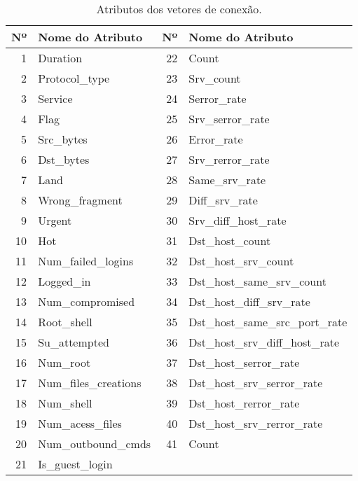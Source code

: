 \begin{table}[h]
\centering
\caption{Atributos dos vetores de conexão.}
\vspace{0.5cm}
\begin{tabular}{|r|l|r|l|}
\hline
\textbf{Nº} & \textbf{Nome do Atributo} & \textbf{Nº} & \textbf{Nome do Atributo} \\
\hline                               
1 & Duration 	  & 22 & Count \\
\hline
2 & Protocol\_type & 23 & Srv\_count \\
\hline
3 & Service    	  & 24 & Serror\_rate \\
\hline
4 & Flag          & 25 & Srv\_serror\_rate \\
\hline
5 & Src\_bytes    & 26 & Error\_rate \\
\hline
6 & Dst\_bytes	  & 27 & Srv\_rerror\_rate \\
\hline
7 & Land	  & 28 & Same\_srv\_rate \\
\hline
8 & Wrong\_fragment & 29 & Diff\_srv\_rate \\
\hline
9 & Urgent 	  & 30 & Srv\_diff\_host\_rate \\
\hline
10 & Hot 	  & 31 & Dst\_host\_count \\
\hline
11 & Num\_failed\_logins & 32 & Dst\_host\_srv\_count \\
\hline
12 & Logged\_in   & 33 & Dst\_host\_same\_srv\_count \\
\hline
13 & Num\_compromised & 34 & Dst\_host\_diff\_srv\_rate\\
\hline
14 & Root\_shell  & 35 & Dst\_host\_same\_src\_port\_rate\\
\hline
15 & Su\_attempted & 36 & Dst\_host\_srv\_diff\_host\_rate\\
\hline
16 & Num\_root    & 37	& Dst\_host\_serror\_rate\\
\hline
17 & Num\_files\_creations & 38 & Dst\_host\_srv\_serror\_rate\\
\hline
18 & Num\_shell   & 39 & Dst\_host\_rerror\_rate\\
\hline
19 & Num\_acess\_files & 40 & Dst\_host\_srv\_rerror\_rate\\
\hline
20 & Num\_outbound\_cmds & 41 & Count\\
\hline
21 & Is\_guest\_login & &\\
\hline
\end{tabular}
\end{table}


